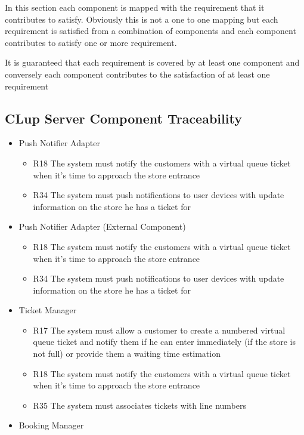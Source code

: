 In this section each component is mapped with the requirement that it contributes to satisfy. Obviously this is not a one to one mapping but each requirement is satisfied from a combination of components and each component contributes to satisfy one or more requirement.

It is guaranteed that each requirement is covered by at least one component and conversely each component contributes to the satisfaction of at least one requirement


\subsection{CLup Server Component Traceability}
\begin{itemize}
    \item Push Notifier Adapter
    \begin{itemize}
        \item R18 The system must notify the customers with a virtual queue ticket when it’s time to approach the store entrance
        \item R34 The system must push notifications to user devices with update information on the store he has a ticket for
    \end{itemize}
    \item Push Notifier Adapter (External Component)
    \begin{itemize}
        \item R18 The system must notify the customers with a virtual queue ticket when it’s time to approach the store entrance
        \item R34 The system must push notifications to user devices with update information on the store he has a ticket for
    \end{itemize}
    \item Ticket Manager
    \begin{itemize}
        \item R17 The system must allow a customer to create a numbered virtual queue ticket and notify them if he can enter immediately (if the store is not full) or provide them a waiting time estimation
        \item R18 The system must notify the customers with a virtual queue ticket when it’s time to approach the store entrance
        \item R35 The system must associates tickets with line numbers
    \end{itemize}
    \item Booking Manager

\end{itemize}
